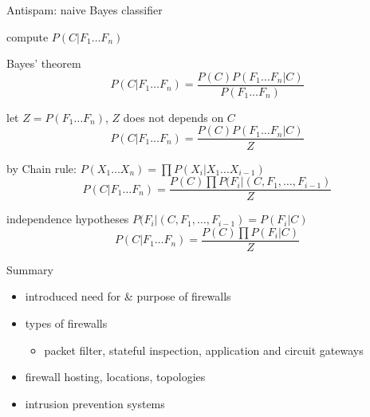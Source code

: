 \documentclass{beamer}
\begin{document}
\begin{frame}{Antispam: naive Bayes classifier}
  \begin{itemize}
     {
  \item compute $P(C|F_1 \dots F_n)$
  \item Bayes' theorem
    \[
    P(C|F_1 \dots F_n) =
    \frac
    {P(C) P(F_1 \dots F_n | C) }
    {P(F_1 \dots F_n)}
    \]
  \item let $Z = P(F_1 \dots F_n)$, $Z$ does not depends on $C$
    \[
    P(C|F_1 \dots F_n) =
    \frac
    {P(C) P(F_1 \dots F_n | C) }
    {Z}
    \]
  }
  \item by Chain rule: $P(X_1 \dots X_n) = \prod{P(X_i | X_1 \dots X_{i-1})}$
    \[
    P(C|F_1 \dots F_n) =
    \frac
    {P(C) 
     \prod{P(F_i| (C,  F_1, \dots, F_{i-1})}
    }
    {Z}
    \]
  \item<2-> independence hypotheses $P(F_i| (C,  F_1, \dots, F_{i-1})
    = P(F_i| C)$
    \[
    P(C|F_1 \dots F_n) =
    \frac
    {P(C) 
     \prod{P(F_i| C)}
    }
    {Z}
    \]
  \end{itemize}
\end{frame}

\begin{frame}{Summary}
  \begin{itemize}
  \item introduced need for \& purpose of firewalls 
  \item types of firewalls 
    \begin{itemize}
    \item packet filter, stateful inspection, application and 
      circuit gateways 
    \end{itemize}
  \item firewall hosting, locations, topologies 
  \item intrusion prevention systems
  \end{itemize}
\end{frame}
\end{document}
